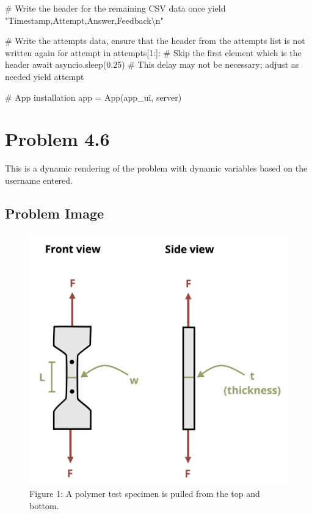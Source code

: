 \documentclass[
  letterpaper,
  DIV=11,
  numbers=noendperiod]{scrreprt}
\newenvironment{Shaded}{\begin{snugshade}}{\end{snugshade}}
\newcommand{\NormalTok}[1]{\textcolor[rgb]{0.00,0.23,0.31}{#1}}
\begin{document}
\begin{Shaded}
\begin{Highlighting}[]
\NormalTok{        \# Write the header for the remaining CSV data once}
\NormalTok{        yield "Timestamp,Attempt,Answer,Feedback\textbackslash{}n"}
        
\NormalTok{        \# Write the attempts data, ensure that the header from the attempts list is not written again}
\NormalTok{        for attempt in attempts[1:]:  \# Skip the first element which is the header}
\NormalTok{            await asyncio.sleep(0.25)  \# This delay may not be necessary; adjust as needed}
\NormalTok{            yield attempt}


\NormalTok{\# App installation}
\NormalTok{app = App(app\_ui, server)}
\end{Highlighting}
\end{Shaded}

\chapter*{Problem 4.6}\label{problem-4.6}


This is a dynamic rendering of the problem with dynamic variables based
on the username entered.

\section*{Problem Image}\label{problem-image-33}


\begin{figure}[H]

{\centering \includegraphics{images/194.png}

}

\caption{Figure 1: A polymer test specimen is pulled from the top and
bottom.}

\end{figure}%
\end{document}
